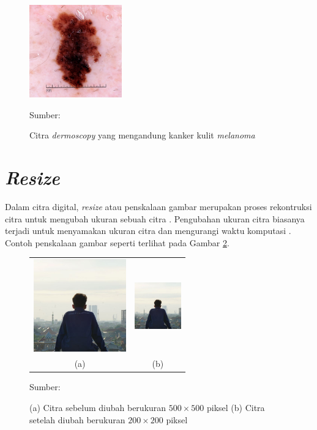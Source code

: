     \begin{figure}[H]
        \begin{center}
            \includegraphics[width=4cm]{../img/Dermoscopy - Latex.jpg}
            \caption{Citra \textit{dermoscopy} yang mengandung kanker kulit \textit{melanoma}}
            \label{fig:dermoscopy}
            Sumber: \citep{Nersisson2021a}
        \end{center}
    \end{figure}

\section{\textit{Resize}}
Dalam citra digital, \textit{resize} atau penskalaan gambar merupakan proses rekontruksi citra untuk mengubah ukuran sebuah citra \citep{Morsy2018}. Pengubahan ukuran citra biasanya terjadi untuk menyamakan ukuran citra dan mengurangi waktu komputasi \citep{AhmedThaajwer2020a,Umamaheswari2018}. Contoh penskalaan gambar seperti terlihat pada Gambar \ref{fig:resize}.

\begin{figure}[H]
    \centering
    \begin{tabular}{cc}
        \includegraphics[width=4cm]{../img/Resize - Latex.JPG}
        &
        \includegraphics[width=2cm]{../img/Resize - Latex.JPG}\\
        (a) &(b)\\
    \end{tabular}
    \caption{(a) Citra sebelum diubah berukuran $500\times 500$ piksel (b) Citra setelah diubah berukuran $200\times 200$ piksel}
    \label{fig:resize}
    Sumber: \citep{Morsy2018}
\end{figure}

